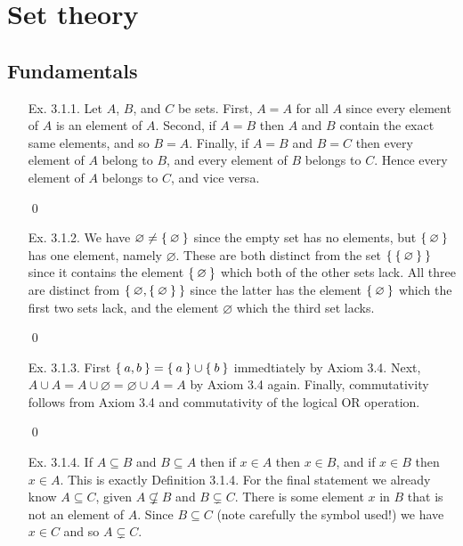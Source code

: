 \chapter{Set theory}

\section{Fundamentals}
\begin{enumerate}[Ex. 3.1.1.]
    \item[Ex. 3.1.1.] Let $A$, $B$, and $C$ be sets. First, $A = A$ for all $A$ since every
    element of $A$ is an element of $A$. Second, if $A = B$ then $A$ and $B$
    contain the exact same elements, and so $B = A$. Finally, if $A = B$ and 
    $B = C$ then every element of $A$ belong to $B$, and every element of $B$
    belongs to $C$. Hence every element of $A$ belongs to $C$, and vice versa.

    \qed

    \item[Ex. 3.1.2.] We have $\varnothing \neq \Set{\varnothing}$ since the empty set has
    no elements, but $\Set{\varnothing}$ has one element, namely $\varnothing$.
    These are both distinct from the set $\Set{\Set{\varnothing}}$ since it
    contains the element $\Set{\varnothing}$ which both of the other sets lack.
    All three are distinct from $\Set{\varnothing, \Set{\varnothing}}$ since
    the latter has the element $\Set{\varnothing}$ which the first two sets
    lack, and the element $\varnothing$ which the third set lacks.

    \qed
    
    \item[Ex. 3.1.3.] First $\Set{a,b} = \Set{a} \cup \Set{b}$ immedtiately by Axiom 3.4.
    Next, $A \cup A = A \cup \varnothing = \varnothing \cup A = A$ by Axiom 3.4
    again. Finally, commutativity follows from Axiom 3.4 and commutativity of
    the logical OR operation.

    \qed

    \item[Ex. 3.1.4.] If $A \subseteq B$ and $B \subseteq A$ then if $x \in A$ then $x \in B$,
    and if $x \in B$ then $x \in A$. This is exactly Definition 3.1.4. For the final
    statement we already know $A\subseteq C$, given $A\not\subsetneq B$ and 
    $B \subsetneq C$. There is some element $x$ in $B$ that is not an element of $A$.
    Since $B\subseteq C$ (note carefully the symbol used!) we have $x\in C$ and so
    $A \subsetneq C$.


\end{enumerate}
